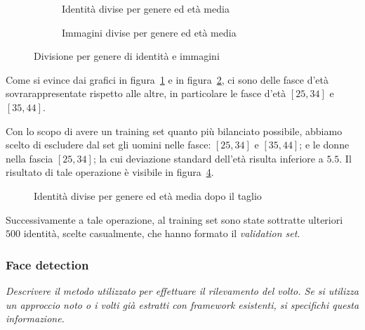\begin{figure}[H]

\begin{subfigure}{0.5\textwidth}
\def\svgscale{0.42}

\caption{Identità divise per genere ed età media}
\label{sfig:Ids per gender and mean age}
\end{subfigure}
\begin{subfigure}{0.5\textwidth}
\def\svgscale{0.42}

\caption{Immagini divise per genere ed età media}
\label{sfig:Images per gender and mean age}
\end{subfigure}
\caption{Divisione per genere di identità e immagini}
\label{fig:gender_age_division}
\end{figure}

Come si evince dai grafici in figura~\ref{sfig:Ids per gender and mean age} e in figura~\ref{sfig:Images per gender and mean age}, ci sono delle fasce d'età sovrarappresentate rispetto alle altre, in particolare le fasce d'età $[25,34]$ e $[35,44]$.

Con lo scopo di avere un training set quanto più bilanciato possibile, abbiamo scelto di escludere dal set gli uomini nelle fasce: $[25,34]$ e $[35,44]$; e le donne nella fascia $[25,34]$; la cui deviazione standard dell'età risulta inferiore a $5.5$. Il risultato di tale operazione è visibile in figura~\ref{fig:Ids per gender and mean age after the drop}.

\begin{figure}[H]
\centering
\def\svgscale{0.7}

\caption{Identità divise per genere ed età media dopo il taglio}
\label{fig:Ids per gender and mean age after the drop}
\end{figure}

Successivamente a tale operazione, al training set sono state sottratte ulteriori $500$ identità, scelte casualmente, che hanno formato il \emph{validation set}.

\subsubsection{Face detection}
\label{subsubsec:face_detection}

\emph{Descrivere il metodo utilizzato per effettuare il rilevamento del volto. Se si utilizza un approccio noto o i volti già estratti con framework esistenti, si specifichi questa informazione.}

